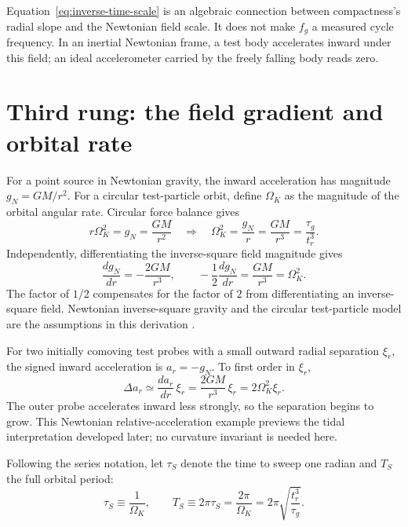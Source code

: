 \documentclass[12pt]{article}
\begin{document}
Equation~\eqref{eq:inverse-time-scale} is an algebraic connection between compactness's radial slope and the Newtonian field scale. It does not make $f_g$ a measured cycle frequency. In an inertial Newtonian frame, a test body accelerates inward under this field; an ideal accelerometer carried by the freely falling body reads zero.

\section{Third rung: the field gradient and orbital rate}
\label{sec:third-rung}

For a point source in Newtonian gravity, the inward acceleration has magnitude $g_N=GM/r^2$. For a circular test-particle orbit, define $\Omega_K$ as the magnitude of the orbital angular rate. Circular force balance gives
\begin{equation}
  r\Omega_K^2=g_N=\frac{GM}{r^2}
  \quad\Longrightarrow\quad
  \Omega_K^2=\frac{g_N}{r}=\frac{GM}{r^3}=\frac{\tau_g}{t_r^3}.
  \label{eq:newtonian-orbit-rate}
\end{equation}
Independently, differentiating the inverse-square field magnitude gives
\begin{equation}
  \frac{dg_N}{dr}=-\frac{2GM}{r^3},
  \qquad
  -\frac{1}{2}\frac{dg_N}{dr}
  =\frac{GM}{r^3}
  =\Omega_K^2.
  \label{eq:third-rung-gradient}
\end{equation}
The factor of $1/2$ compensates for the factor of $2$ from differentiating an inverse-square field. Newtonian inverse-square gravity and the circular test-particle model are the assumptions in this derivation \cite{NASAFlight}.

For two initially comoving test probes with a small outward radial separation $\xi_r$, the signed inward acceleration is $a_r=-g_N$. To first order in $\xi_r$,
\begin{equation}
  \Delta a_r\simeq\frac{da_r}{dr}\,\xi_r
  =\frac{2GM}{r^3}\,\xi_r
  =2\Omega_K^2\xi_r.
  \label{eq:radial-tide}
\end{equation}
The outer probe accelerates inward less strongly, so the separation begins to grow. This Newtonian relative-acceleration example previews the tidal interpretation developed later; no curvature invariant is needed here.

Following the series notation, let $\tau_S$ denote the time to sweep one radian and $T_S$ the full orbital period:
\begin{equation}
  \tau_S\equiv\frac{1}{\Omega_K},
  \qquad
  T_S\equiv2\pi\tau_S
      =\frac{2\pi}{\Omega_K}
      =2\pi\sqrt{\frac{t_r^3}{\tau_g}}.
  \label{eq:period}
\end{equation}
\end{document}
